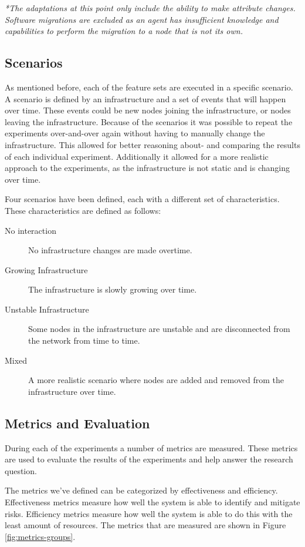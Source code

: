 {\small \textit{*The adaptations at this point only include the ability to make attribute changes. Software migrations are excluded as an agent has insufficient knowledge and capabilities to perform the migration to a node that is not its own.}}

\subsection*{Scenarios}
As mentioned before, each of the feature sets are executed in a specific scenario. A scenario is defined by an infrastructure and a set of events that will happen over time. These events could be new nodes joining the infrastructure, or nodes leaving the infrastructure. Because of the scenarios it was possible to repeat the experiments over-and-over again without having to manually change the infrastructure. This allowed for better reasoning about- and comparing the results of each individual experiment. Additionally it allowed for a more realistic approach to the experiments, as the infrastructure is not static and is changing over time.

Four scenarios have been defined, each with a different set of characteristics. These characteristics are defined as follows:

\begin{description}
    \item[No interaction]             No infrastructure changes are made overtime.
    \item[Growing Infrastructure]     The infrastructure is slowly growing over time.
    \item[Unstable Infrastructure]    Some nodes in the infrastructure are unstable and are disconnected from the network from time to time.
    \item[Mixed]                      A more realistic scenario where nodes are added and removed from the infrastructure over time.
\end{description}

\subsection{Metrics and Evaluation}
\label{ssec:metrics}
During each of the experiments a number of metrics are measured. These metrics are used to evaluate the results of the experiments and help answer the research question. 

The metrics we've defined can be categorized by effectiveness and efficiency. Effectiveness metrics measure how well the system is able to identify and mitigate risks. Efficiency metrics measure how well the system is able to do this with the least amount of resources. The metrics that are measured are shown in Figure \ref{fig:metrics-groups}.

